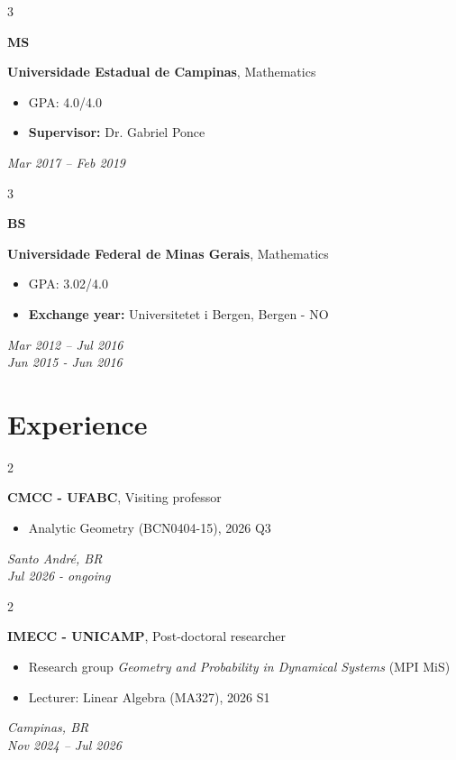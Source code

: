\documentclass[10pt, letterpaper]{article}
\newenvironment{highlights}{
    \begin{itemize}[
        topsep=0.10 cm,
        parsep=0.10 cm,
        partopsep=0pt,
        itemsep=0pt,
        leftmargin=0.4 cm + 10pt
    ]
}{
    \end{itemize}
} %
\newenvironment{twocolentry}[2][]{
    \onecolentry
    \def\secondColumn{#2}
    \setcolumnwidth{\fill, 5 cm}
    \begin{paracol}{2}
    \small 
}{
    \switchcolumn \raggedleft \secondColumn
    \end{paracol}
    \endonecolentry
} %
\newenvironment{threecolentry}[3][]{
    \onecolentry
    \def\thirdColumn{#3}
    \setcolumnwidth{1 cm, \fill, 5 cm}
    \begin{paracol}{3}
    \small 
    {\raggedright #2} \switchcolumn
}{
    \switchcolumn \raggedleft \thirdColumn
    \end{paracol}
    \endonecolentry
} %
\begin{document}
    \begin{threecolentry}{\textbf{MS}}{\textit{Mar 2017 – Feb 2019}}
        \textbf{Universidade Estadual de Campinas}, Mathematics
        \begin{highlights}
            \item GPA: 4.0/4.0 
            \item \textbf{Supervisor:} Dr. Gabriel Ponce
        \end{highlights}
    \end{threecolentry}
    
    \begin{threecolentry}{\textbf{BS}}{\textit{Mar 2012 – Jul 2016 \\ \vspace{0.6cm}  Jun 2015 - Jun 2016}}
        \textbf{Universidade Federal de Minas Gerais}, Mathematics
        \begin{highlights}
            \item GPA: 3.02/4.0 
            \item \textbf{Exchange year:} Universitetet i Bergen, Bergen - NO  
        \end{highlights}
    \end{threecolentry}

    \section{Experience}

    \begin{twocolentry}{\textit{Santo André, BR \\ Jul 2026 - ongoing}}
        \textbf{CMCC - UFABC}, Visiting professor
        \begin{highlights}
            \item Analytic Geometry (BCN0404-15), 2026 Q3
        \end{highlights}
    \end{twocolentry} \vspace{0.1cm}

    \begin{twocolentry}{\textit{Campinas, BR \\ Nov 2024 – Jul 2026}}
        \textbf{IMECC - UNICAMP}, Post-doctoral researcher
        \begin{highlights}
            \item Research group \textit{Geometry and Probability in Dynamical Systems} (MPI MiS)
            \item Lecturer: Linear Algebra (MA327), 2026 S1
        \end{highlights}
    \end{twocolentry} \vspace{0.1cm}
\end{document}
